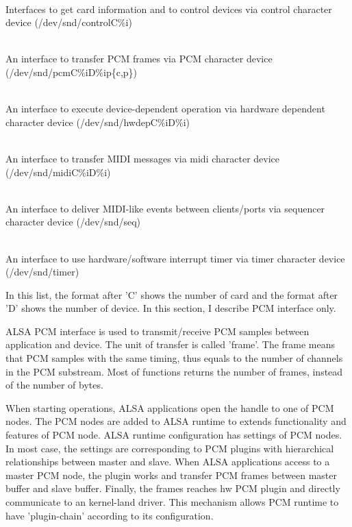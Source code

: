 \documentclass[onecolumn]{article}
\begin{document}
\begin{description}
\small
\item[Mixer/hcontrol/control interface] \mbox{} \\
Interfaces to get card information and to control devices via control character device (/dev/snd/controlC\%i)
\item[PCM interface] \mbox{} \\
An interface to transfer PCM frames via PCM character device (/dev/snd/pcmC\%iD\%ip\{c,p\})
\item[hwdep interface] \mbox{} \\
An interface to execute device-dependent operation via hardware dependent character device (/dev/snd/hwdepC\%iD\%i)
\item[RawMidi interface] \mbox{} \\
An interface to transfer MIDI messages via midi character device (/dev/snd/midiC\%iD\%i)
\item[Sequencer interface] \mbox{} \\
An interface to deliver MIDI-like events between clients/ports via sequencer character device (/dev/snd/seq)
\item[Timer interface] \mbox{} \\
An interface to use hardware/software interrupt timer via timer character device (/dev/snd/timer)
\end{description}

In this list, the format after 'C' shows the number of card and the format after 'D' shows the number of device. In this section, I describe PCM interface only.

ALSA PCM interface is used to transmit/receive PCM samples between application and device. The unit of transfer is called 'frame'. The frame means that PCM samples with the same timing, thus equals to the number of channels in the PCM substream. Most of functions returns the number of frames, instead of the number of bytes.

When starting operations, ALSA applications open the handle to one of PCM nodes. The PCM nodes are added to ALSA runtime to extends functionality and features of PCM node. ALSA runtime configuration has settings of PCM nodes. In most case, the settings are corresponding to PCM plugins with hierarchical relationships between master and slave. When ALSA applications access to a master PCM node, the plugin works and transfer PCM frames between master buffer and slave buffer. Finally, the frames reaches hw PCM plugin and directly communicate to an kernel-land driver. This mechanism allows PCM runtime to have 'plugin-chain' according to its configuration. 
\end{document}
